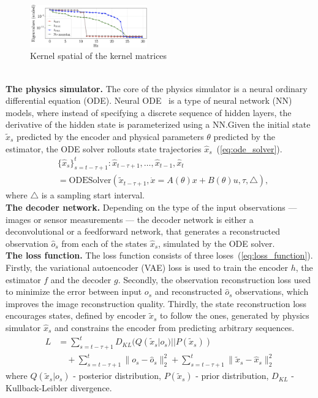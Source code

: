 \documentclass[acmtog]{techreportacmart}
\begin{document}
\begin{figure}
  \centering
  \includegraphics[width=0.45\textwidth]{eigenvalues}
  \caption{Kernel spatial of the kernel matrices}
  \label{fig:eigenvalues}
\end{figure}
\\
\textbf{The physics simulator.} The core of the physics simulator is a neural ordinary differential equation (ODE). Neural ODE~\cite{NEURIPS2018_69386f6b} is a type of neural network (NN) models, where instead of specifying a discrete sequence of hidden layers, the derivative of the hidden state is parameterized using a NN.\@ Given the initial state ${\tilde{x}_{s}}$ predicted by the encoder and physical parameters ${\theta}$ predicted by the estimator, the ODE solver rollouts state trajectories ${\hat{x}_s}$~(\ref{eq:ode_solver}).
\begin{align}
  \label{eq:ode_solver}
  & \{ \hat{x}_s \}_{s=t-\tau+1}^{t} : \hat{x}_{t-\tau+1}, \ldots, \hat{x}_{t-1}, \hat{x}_t \nonumber \\
  & = \text{ODESolver}( \tilde{x}_{t-\tau+1}, \dot{x} = A({\theta}) x + B({\theta}) u, \tau, \triangle ),
\end{align}
where ${\triangle}$ is a sampling start interval.
\\
\textbf{The decoder network.} Depending on the type of the input observations — images or sensor measurements — the decoder network is either a deconvolutional or a feedforward network, that generates a reconstructed observation ${\hat{o}_s}$ from each of the states ${\hat{x}_s}$, simulated by the ODE solver.
\\
\textbf{The loss function.} The loss function consists of three loses~(\ref{eq:loss_function}). Firstly, the variational autoencoder (VAE) loss is used to train the encoder ${h}$, the estimator ${f}$ and the decoder ${g}$. Secondly, the observation reconstruction loss used to minimize the error between input ${o_s}$ and reconstructed ${\hat{o}_s}$ observations, which improves the image reconstruction quality. Thirdly, the state reconstruction loss encourages states, defined by encoder ${\tilde{x}_{s}}$ to follow the ones, generated by physics simulator ${\hat{x}_s}$ and constrains the encoder from predicting arbitrary sequences.
\begin{equation}
  \label{eq:loss_function}
  \begin{aligned}
  L &= \sum_{s=t-\tau+1}^{t} D_{KL}(Q(\tilde{x}_s|o_s) || P(\tilde{x}_s)) \\
  &\quad + \sum_{s=t-\tau+1}^{t} \| o_s - \hat{o}_s \|_2^2 + \sum_{s=t-\tau+1}^{t} \| \tilde{x}_s - \hat{x}_s \|_2^2
  \end{aligned}
\end{equation}
where ${Q(\tilde{x}_s|o_s)}$ - posterior distribution, ${P(\tilde{x}_s)}$ - prior distribution, ${D_{KL}}$ - Kullback-Leibler divergence.
\end{document}
